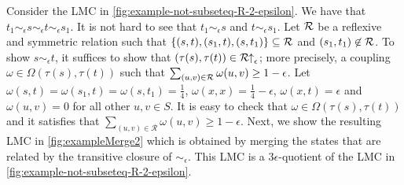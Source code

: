 
\begin{example}\label{example:s-t-not-global-2epsilon-related}
Consider the LMC in \cref{fig:example-not-subseteq-R-2-epsilon}. We have that $t_1 \sim_{\epsilon}  s  \sim_{\epsilon}  t \sim_{\epsilon}  s_1$. It is not hard to see that $t_1 \sim_{\epsilon}  s$ and $t \sim_{\epsilon}  s_1$. Let $\mathcal{R}$ be a reflexive and symmetric relation such that $\{(s, t), (s_1, t), (s, t_1)\} \subseteq \mathcal{R}$ and $(s_1, t_1) \not\in \mathcal{R}$. To show $s \sim_{\epsilon}  t$, it suffices to show that $(\tau(s), \tau(t)) \in \mathord{\mathcal{R}\!\!\uparrow}_{\epsilon}$; more precisely, a coupling $\omega \in \Omega(\tau(s), \tau(t))$ such that $\sum_{ (u,v) \in \mathcal{R}} \omega(u, v) \ge 1 - \epsilon$. Let $\omega(s, t) = \omega(s_1, t) = \omega(s, t_1) = \frac{1}{4}$, $\omega(x,x) = \frac{1}{4} - \epsilon$, $\omega(x, t) = \epsilon$ and $\omega(u,v) = 0$ for all other $u, v \in S$. It is easy to check that $\omega \in \Omega(\tau(s), \tau(t))$ and it satisfies that  $\sum_{ (u,v) \in \mathcal{R}} \omega(u, v) \ge 1 - \epsilon$. Next, we show the resulting LMC in \cref{fig:exampleMerge2} which is obtained by merging the states that are related by the transitive closure of $\sim_{\epsilon}$. This LMC is a $3\epsilon$-quotient of the LMC in \cref{fig:example-not-subseteq-R-2-epsilon}.

\begin{figure}[h]
\end{figure}
\end{example}
